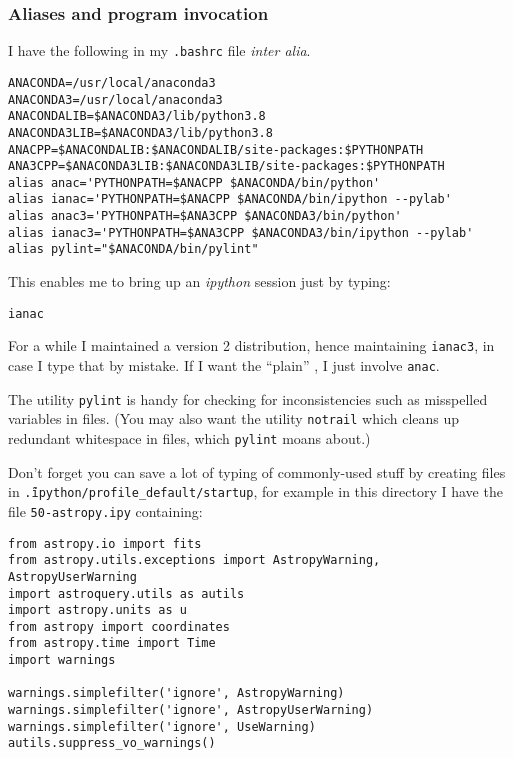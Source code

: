 \subsubsection{Aliases and program invocation}
\protect\label{section:invocation}

I have the following in my \texttt{.bashrc} file \textit{inter alia}.

\begin{verbatim}
ANACONDA=/usr/local/anaconda3
ANACONDA3=/usr/local/anaconda3
ANACONDALIB=$ANACONDA3/lib/python3.8
ANACONDA3LIB=$ANACONDA3/lib/python3.8
ANACPP=$ANACONDALIB:$ANACONDALIB/site-packages:$PYTHONPATH
ANA3CPP=$ANACONDA3LIB:$ANACONDA3LIB/site-packages:$PYTHONPATH
alias anac='PYTHONPATH=$ANACPP $ANACONDA/bin/python'
alias ianac='PYTHONPATH=$ANACPP $ANACONDA/bin/ipython --pylab'
alias anac3='PYTHONPATH=$ANA3CPP $ANACONDA3/bin/python'
alias ianac3='PYTHONPATH=$ANA3CPP $ANACONDA3/bin/ipython --pylab'
alias pylint="$ANACONDA/bin/pylint"
\end{verbatim}

This enables me to bring up an \textit{ipython} session just by typing:

\begin{verbatim}
ianac
\end{verbatim}

For a while I maintained a version 2 distribution, hence maintaining
\texttt{ianac3}, in case I type that by mistake. If I want the ``plain'' \py, I
just involve \texttt{anac}.

The utility \texttt{pylint} is handy for checking for inconsistencies such as
misspelled variables in files. (You may also want the utility \texttt{notrail}
which cleans up redundant whitespace in files, which \texttt{pylint} moans
about.)

Don't forget you can save a lot of typing of commonly-used stuff by creating
files in \texttt{\~.ipython/profile\_default/startup}, for example in this
directory I have the file \texttt{50-astropy.ipy} containing:

\begin{verbatim}
from astropy.io import fits
from astropy.utils.exceptions import AstropyWarning, AstropyUserWarning
import astroquery.utils as autils
import astropy.units as u
from astropy import coordinates
from astropy.time import Time
import warnings

warnings.simplefilter('ignore', AstropyWarning)
warnings.simplefilter('ignore', AstropyUserWarning)
warnings.simplefilter('ignore', UseWarning)
autils.suppress_vo_warnings()
\end{verbatim}

